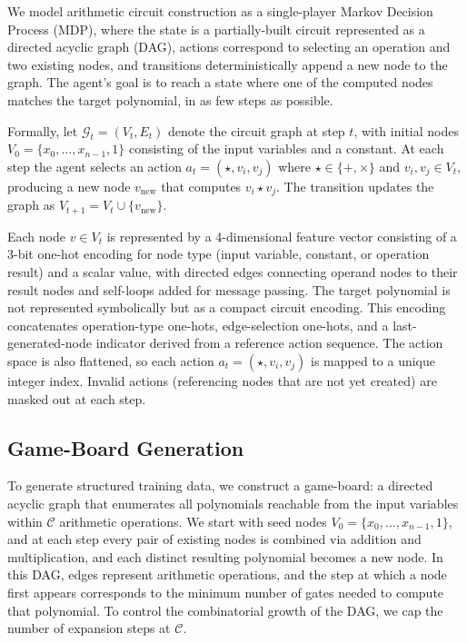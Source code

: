 \documentclass{article} %
\begin{document}
We model arithmetic circuit construction as a single-player Markov Decision Process (MDP), where the state is a partially-built circuit represented as a directed acyclic graph (DAG), actions correspond to selecting an operation and two existing nodes, and transitions deterministically append a new node to the graph. The agent's goal is to reach a state where one of the computed nodes matches the target polynomial, in as few steps as possible.

Formally, let $\mathcal{G}_t = (V_t, E_t)$ denote the circuit graph at step $t$, with initial nodes $V_0 = \{x_0, \ldots, x_{n-1}, 1\}$ consisting of the input variables and a constant. At each step the agent selects an action $a_t = (\star, v_i, v_j)$ where $\star \in \{+, \times\}$ and $v_i, v_j \in V_t$, producing a new node $v_{\text{new}}$ that computes $v_i \star v_j$. The transition updates the graph as $V_{t+1} = V_t \cup \{v_{\text{new}}\}$.

Each node $v \in V_t$ is represented by a 4-dimensional feature vector consisting of a 3-bit one-hot encoding for node type (input variable, constant, or operation result) and a scalar value, with directed edges connecting operand nodes to their result nodes and self-loops added for message passing. The target polynomial is not represented symbolically but as a compact circuit encoding. This encoding concatenates operation-type one-hots, edge-selection one-hots, and a last-generated-node indicator derived from a reference action sequence. The action space is also flattened, so each action $a_t = (\star, v_i, v_j)$ is mapped to a unique integer index. Invalid actions (referencing nodes that are not yet created) are masked out at each step.

\subsection{Game-Board Generation}

To generate structured training data, we construct a game-board: a directed acyclic graph that enumerates all polynomials reachable from the input variables within $\mathcal{C}$ arithmetic operations. We start with seed nodes $V_0 = \{x_0, \ldots, x_{n-1}, 1\}$,  and at each step every pair of existing nodes is combined via addition and multiplication, and each distinct resulting polynomial becomes a new node. In this DAG, edges represent arithmetic operations, and the step at which a node first appears corresponds to the minimum number of gates needed to compute that polynomial. To control the combinatorial growth of the DAG, we cap the number of expansion steps at $\mathcal{C}$. 
\end{document}
